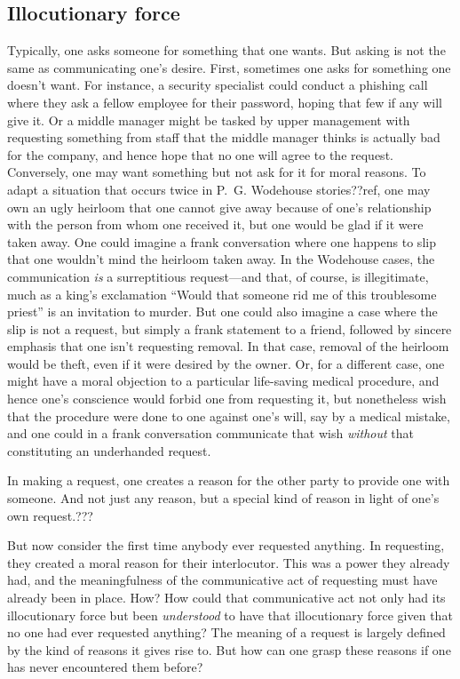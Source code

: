 \subsection{Illocutionary force}
Typically, one asks someone for something that one wants. But asking is not the same as communicating one's desire. First,
sometimes one asks for something one doesn't want. For instance, a security specialist could conduct a phishing call where they
ask a fellow employee for their password, hoping that few if any will give it. Or a middle manager might be tasked by upper
management with requesting something from staff that the middle manager thinks is actually bad for the company, and hence hope
that no one will agree to the request. Conversely, one may want something but not ask for it for moral reasons. To adapt a 
situation that occurs twice in P.~G. Wodehouse stories??ref, one may own an ugly heirloom that one cannot give away because 
of one's relationship with the person from whom one received it, but one would be glad if it were taken away. One could imagine
a frank conversation where one happens to slip that one wouldn't mind the heirloom taken away. In the Wodehouse
cases, the communication \textit{is} a surreptitious request---and that, of course, is illegitimate, much as a king's
exclamation ``Would that someone rid me of this troublesome priest'' is an invitation to murder. But one could also imagine
a case where the slip is not a request, but simply a frank statement to a friend, followed by sincere emphasis that one isn't
requesting removal. In that case, removal of the heirloom would be theft, even if it were desired by the owner. Or, for a
different case, one might have a moral objection to a particular life-saving medical procedure, and hence one's conscience would
forbid one from requesting it, but nonetheless wish that the procedure were done to one against one's will, say by a medical
mistake, and one could in a frank conversation communicate that wish \textit{without} that constituting an underhanded request.

In making a request, one creates a reason for the other party to provide one with someone. And not just any reason, but a special
kind of reason in light of one's own request.???

But now consider the first time anybody ever requested anything. In requesting, they created a moral reason for their interlocutor. 
This was a power they already had, and the meaningfulness of the communicative act of requesting must have already been in place. 
How? How could that communicative act not only had its illocutionary force but been \textit{understood} to have that illocutionary 
force given that no one had ever requested anything? The meaning of a request is largely defined by the kind of reasons it gives
rise to. But how can one grasp these reasons if one has never encountered them before?

